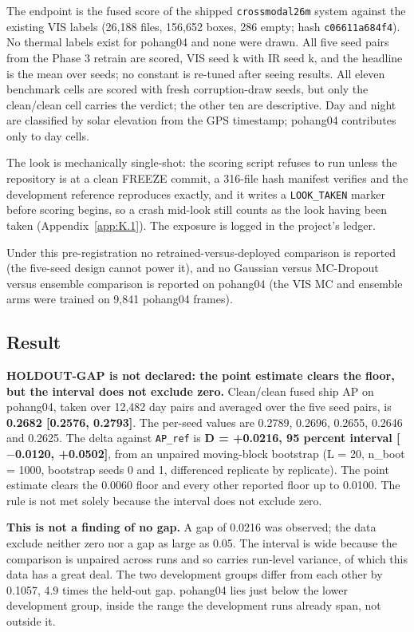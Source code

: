 \documentclass[10pt]{article}
\begin{document}
The endpoint is the fused score of the shipped \texttt{crossmodal26m} system against the existing VIS labels (26,188 files, 156,652 boxes, 286 empty; hash \texttt{c06611a684f4}). No thermal labels exist for pohang04 and none were drawn. All five seed pairs from the Phase 3 retrain are scored, VIS seed k with IR seed k, and the headline is the mean over seeds; no constant is re-tuned after seeing results. All eleven benchmark cells are scored with fresh corruption-draw seeds, but only the clean/clean cell carries the verdict; the other ten are descriptive. Day and night are classified by solar elevation from the GPS timestamp; pohang04 contributes only to day cells.

The look is mechanically single-shot: the scoring script refuses to run unless the repository is at a clean FREEZE commit, a 316-file hash manifest verifies and the development reference reproduces exactly, and it writes a \texttt{LOOK\_\allowbreak{}TAKEN} marker before scoring begins, so a crash mid-look still counts as the look having been taken (Appendix~\ref{app:K.1}). The exposure is logged in the project's ledger.

Under this pre-registration no retrained-versus-deployed comparison is reported (the five-seed design cannot power it), and no Gaussian versus MC-Dropout versus ensemble comparison is reported on pohang04 (the VIS MC and ensemble arms were trained on 9,841 pohang04 frames).

\subsection{Result}\label{sec:7.2}
\textbf{HOLDOUT-GAP is not declared: the point estimate clears the floor, but the interval does not exclude zero.} Clean/clean fused ship AP on pohang04, taken over 12,482 day pairs and averaged over the five seed pairs, is \textbf{0.2682 [0.2576, 0.2793]}. The per-seed values are 0.2789, 0.2696, 0.2655, 0.2646 and 0.2625. The delta against \texttt{AP\_\allowbreak{}ref} is \textbf{D = +0.0216, 95 percent interval [$-$0.0120, +0.0502]}, from an unpaired moving-block bootstrap (L = 20, n\_boot = 1000, bootstrap seeds 0 and 1, differenced replicate by replicate). The point estimate clears the 0.0060 floor and every other reported floor up to 0.0100. The rule is not met solely because the interval does not exclude zero.

\textbf{This is not a finding of no gap.} A gap of 0.0216 was observed; the data exclude neither zero nor a gap as large as 0.05. The interval is wide because the comparison is unpaired across runs and so carries run-level variance, of which this data has a great deal. The two development groups differ from each other by 0.1057, 4.9 times the held-out gap. pohang04 lies just below the lower development group, inside the range the development runs already span, not outside it.
\end{document}
